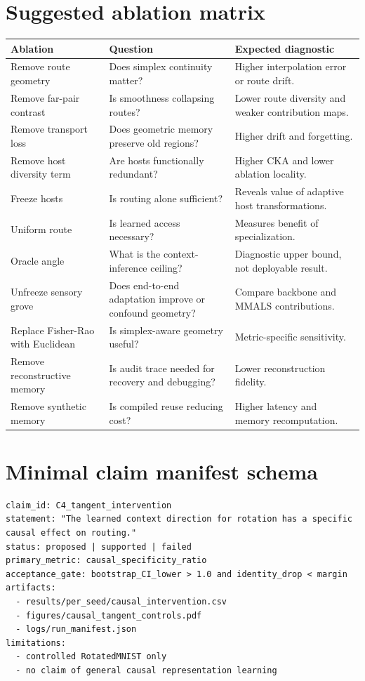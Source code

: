 \documentclass[11pt,a4paper]{article}
\begin{document}
\section{Suggested ablation matrix}

\begin{longtable}{@{}p{4cm}p{5cm}p{5cm}@{}}
\toprule
\textbf{Ablation} & \textbf{Question} & \textbf{Expected diagnostic} \\
\midrule
Remove route geometry & Does simplex continuity matter? & Higher interpolation error or route drift. \\
Remove far-pair contrast & Is smoothness collapsing routes? & Lower route diversity and weaker contribution maps. \\
Remove transport loss & Does geometric memory preserve old regions? & Higher drift and forgetting. \\
Remove host diversity term & Are hosts functionally redundant? & Higher CKA and lower ablation locality. \\
Freeze hosts & Is routing alone sufficient? & Reveals value of adaptive host transformations. \\
Uniform route & Is learned access necessary? & Measures benefit of specialization. \\
Oracle angle & What is the context-inference ceiling? & Diagnostic upper bound, not deployable result. \\
Unfreeze sensory grove & Does end-to-end adaptation improve or confound geometry? & Compare backbone and MMALS contributions. \\
Replace Fisher-Rao with Euclidean & Is simplex-aware geometry useful? & Metric-specific sensitivity. \\
Remove reconstructive memory & Is audit trace needed for recovery and debugging? & Lower reconstruction fidelity. \\
Remove synthetic memory & Is compiled reuse reducing cost? & Higher latency and memory recomputation. \\
\bottomrule
\end{longtable}

\section{Minimal claim manifest schema}

\begin{lstlisting}
claim_id: C4_tangent_intervention
statement: "The learned context direction for rotation has a specific causal effect on routing."
status: proposed | supported | failed
primary_metric: causal_specificity_ratio
acceptance_gate: bootstrap_CI_lower > 1.0 and identity_drop < margin
artifacts:
  - results/per_seed/causal_intervention.csv
  - figures/causal_tangent_controls.pdf
  - logs/run_manifest.json
limitations:
  - controlled RotatedMNIST only
  - no claim of general causal representation learning
\end{lstlisting}
\end{document}
